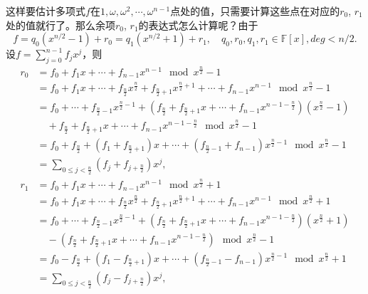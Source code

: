 \documentclass[10pt]{ctexart}
\begin{document}
这样要估计多项式$f$在$1, \omega, \omega^2, \cdots, \omega^{n-1}$点处的值，只需要计算这些点在对应的$r_0$, $r_1$处的值就行了。那么余项$r_0$, $r_1$的表达式怎么计算呢？由于
\begin{displaymath}
    f = q_0(x^{n/2}-1) + r_0 = q_1(x^{n/2}+1) + r_1, \quad q_0,r_0,q_1,r_1 \in \mathbb{F}[x], deg < n/2.
\end{displaymath}
设$f = \sum_{j = 0}^{n-1}f_j x^j$，则
\begin{displaymath}
    \begin{aligned}
        r_0  & = f_0 + f_1x + \cdots + f_{n-1}x^{n-1} \mod x^{\frac{n}{2}} - 1 \\
        & = f_0 + f_1x + \cdots + f_{\frac{n}{2}}x^{\frac{n}{2}} + f_{\frac{n}{2} + 1}x^{\frac{n}{2} + 1} + \cdots + f_{n-1}x^{n-1}  \mod x^{\frac{n}{2}} - 1 \\
        & = f_0 +  \cdots + f_{\frac{n}{2}-1}x^{\frac{n}{2}-1} + (f_{\frac{n}{2}} + f_{\frac{n}{2} + 1}x + \cdots + f_{n-1}x^{n-1 - \frac{n}{2}})(x^{\frac{n}{2}} - 1) \\
        & \quad + f_{\frac{n}{2}} + f_{\frac{n}{2} + 1}x + \cdots + f_{n-1}x^{n-1 - \frac{n}{2}} \mod x^{\frac{n}{2}} - 1 \\
        & = f_0 + f_{\frac{n}{2}} + (f_1 + f_{\frac{n}{2} + 1})x + \cdots + (f_{\frac{n}{2}-1} + f_{n-1})x^{\frac{n}{2}-1} \mod x^{\frac{n}{2}} - 1 \\
        & = \sum_{0 \le j < \frac{n}{2}}(f_j + f_{j+\frac{n}{2}})x^j,
    \end{aligned}
\end{displaymath}
\begin{displaymath}
    \begin{aligned}
        r_1  & = f_0 + f_1x + \cdots + f_{n-1}x^{n-1} \mod x^{\frac{n}{2}} + 1 \\
        & = f_0 + f_1x + \cdots + f_{\frac{n}{2}}x^{\frac{n}{2}} + f_{\frac{n}{2} + 1}x^{\frac{n}{2} + 1} + \cdots + f_{n-1}x^{n-1}  \mod x^{\frac{n}{2}} + 1 \\
        & = f_0 +  \cdots + f_{\frac{n}{2}-1}x^{\frac{n}{2}-1} + (f_{\frac{n}{2}} + f_{\frac{n}{2} + 1}x + \cdots + f_{n-1}x^{n-1 - \frac{n}{2}})(x^{\frac{n}{2}} + 1) \\
        & \quad -( f_{\frac{n}{2}} + f_{\frac{n}{2} + 1}x + \cdots + f_{n-1}x^{n-1 - \frac{n}{2}}) \mod x^{\frac{n}{2}} - 1 \\
        & = f_0 - f_{\frac{n}{2}} + (f_1 - f_{\frac{n}{2} + 1})x + \cdots + (f_{\frac{n}{2}-1} - f_{n-1})x^{\frac{n}{2}-1} \mod x^{\frac{n}{2}} + 1 \\
        & = \sum_{0 \le j < \frac{n}{2}}(f_j - f_{j+\frac{n}{2}})x^j,
    \end{aligned}
\end{displaymath}
\end{document}
